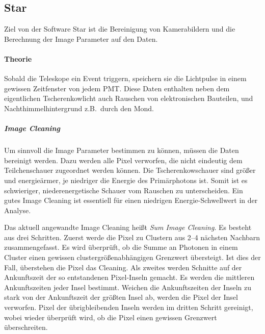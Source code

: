 \subsection{Star}%
\label{sub:star}
Ziel von der Software Star ist die Bereinigung von Kamerabildern und die Berechnung
der Image Parameter auf den Daten.

\paragraph{Theorie}
Sobald die Teleskope ein Event triggern,
speichern sie die Lichtpulse in einem gewissen Zeitfenster von jedem PMT.\@
Diese Daten enthalten neben dem eigentlichen Tscherenkowlicht auch
Rauschen von elektronischen Bauteilen,
und Nachthimmelhintergrund z.B.\ durch den Mond.

\subparagraph{Image Cleaning}
Um sinn\-voll die Im\-age Pa\-ra\-met\-er bestimmen zu können,
müssen die Daten bereinigt werden.
Dazu werden alle Pixel verworfen,
die nicht eindeutig dem Teilchenschauer zugeordnet werden können.
Die Tscherenkowschauer sind größer und energieärmer,
je niedriger die Energie des Primärphotons ist.
Somit ist es schwieriger, niederenergetische Schauer
vom Rauschen zu unterscheiden.
Ein gutes Image Cleaning ist essentiell für einen niedrigen
Energie-Schwellwert in der Analyse.

Das aktuell angewandte Image Cleaning heißt \textit{Sum Image Cleaning}.
Es besteht aus drei Schritten.
Zuerst werde die Pixel zu Clustern aus 2--4 nächsten Nachbarn zusammengefasst.
Es wird überprüft, ob die Summe an Photonen in einem Cluster
einen gewissen clustergrößenabhängigen Grenzwert übersteigt.
Ist dies der Fall, überstehen die Pixel das Cleaning.
Als zweites werden Schnitte auf der Ankunftszeit der so entstandenen
Pixel-Inseln gemacht.
Es werden die mittleren Ankunftszeiten jeder Insel bestimmt.
Weichen die Ankunftszeiten der Inseln zu stark von der Ankunftszeit der größten Insel ab,
werden die Pixel der Insel verworfen.
Pixel der übrigbleibenden Inseln werden im dritten Schritt gereinigt,
wobei
wieder überprüft wird, ob die Pixel einen gewissen Grenzwert überschreiten.

